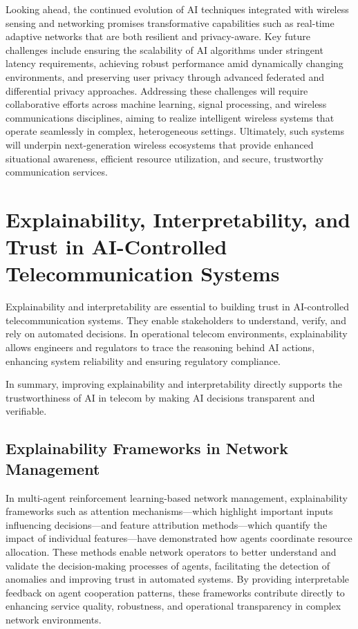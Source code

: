 \documentclass[sigconf]{acmart}
\begin{document}
Looking ahead, the continued evolution of AI techniques integrated with wireless sensing and networking promises transformative capabilities such as real-time adaptive networks that are both resilient and privacy-aware. Key future challenges include ensuring the scalability of AI algorithms under stringent latency requirements, achieving robust performance amid dynamically changing environments, and preserving user privacy through advanced federated and differential privacy approaches. Addressing these challenges will require collaborative efforts across machine learning, signal processing, and wireless communications disciplines, aiming to realize intelligent wireless systems that operate seamlessly in complex, heterogeneous settings. Ultimately, such systems will underpin next-generation wireless ecosystems that provide enhanced situational awareness, efficient resource utilization, and secure, trustworthy communication services.

\section{Explainability, Interpretability, and Trust in AI-Controlled Telecommunication Systems}

Explainability and interpretability are essential to building trust in AI-controlled telecommunication systems. They enable stakeholders to understand, verify, and rely on automated decisions. In operational telecom environments, explainability allows engineers and regulators to trace the reasoning behind AI actions, enhancing system reliability and ensuring regulatory compliance. 

In summary, improving explainability and interpretability directly supports the trustworthiness of AI in telecom by making AI decisions transparent and verifiable.

\subsection{Explainability Frameworks in Network Management}

In multi-agent reinforcement learning-based network management, explainability frameworks such as attention mechanisms—which highlight important inputs influencing decisions—and feature attribution methods—which quantify the impact of individual features—have demonstrated how agents coordinate resource allocation. These methods enable network operators to better understand and validate the decision-making processes of agents, facilitating the detection of anomalies and improving trust in automated systems. By providing interpretable feedback on agent cooperation patterns, these frameworks contribute directly to enhancing service quality, robustness, and operational transparency in complex network environments.
\end{document}
